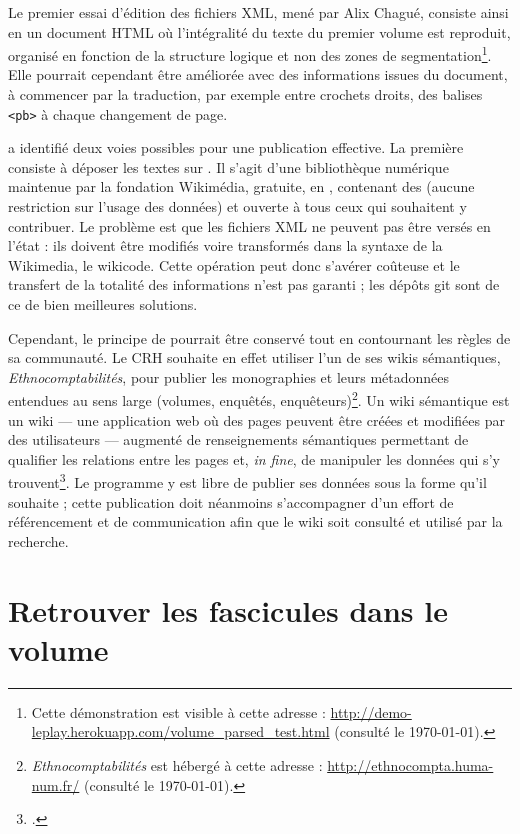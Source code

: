 Le premier essai d'édition des fichiers XML, mené par Alix Chagué, consiste ainsi en un document HTML où l'intégralité du texte du premier volume est reproduit, organisé en fonction de la structure logique et non des zones de segmentation\footnote{Cette démonstration est visible à cette adresse : \url{http://demo-leplay.herokuapp.com/volume_parsed_test.html} (consulté le \today).}. Elle pourrait cependant être améliorée avec des informations issues du document, à commencer par la traduction, par exemple entre crochets droits, des balises \texttt{<pb>} à chaque changement de page.

\timeus{} a identifié deux voies possibles pour une publication effective. La première consiste à déposer les textes sur \wikisource. Il s'agit d'une bibliothèque numérique maintenue par la fondation Wikimédia, gratuite, en \openaccess, contenant des \opendata{} (aucune restriction sur l'usage des données) et ouverte à tous ceux qui souhaitent y contribuer. Le problème est que les fichiers XML ne peuvent pas être versés en l'état : ils doivent être modifiés voire transformés dans la syntaxe de la Wikimedia, le wikicode. Cette opération peut donc s'avérer coûteuse et le transfert de la totalité des informations n'est pas garanti ; les dépôts git sont de ce \pov{} de bien meilleures solutions.

Cependant, le principe de \wikisource{} pourrait être conservé tout en contournant les règles de sa communauté. Le CRH souhaite en effet utiliser l'un de ses wikis sémantiques, \textit{Ethnocomptabilités}, pour publier les monographies et leurs métadonnées entendues au sens large (volumes, enquêtés, enquêteurs)\footnote{\textit{Ethnocomptabilités} est hébergé à cette adresse : \url{http://ethnocompta.huma-num.fr/} (consulté le \today).}. Un wiki sémantique est un wiki --- \cad{} une application web où des pages peuvent être créées et modifiées par des utilisateurs --- augmenté de renseignements sémantiques permettant de qualifier les relations entre les pages et, \textit{in fine}, de manipuler les données qui s'y trouvent\footcite{poupeau}. Le programme \timeus{} y est libre de publier ses données sous la forme qu'il souhaite ; cette publication doit néanmoins s'accompagner d'un effort de référencement et de communication afin que le wiki soit consulté et utilisé par la recherche.

\section{Retrouver les fascicules dans le volume}

